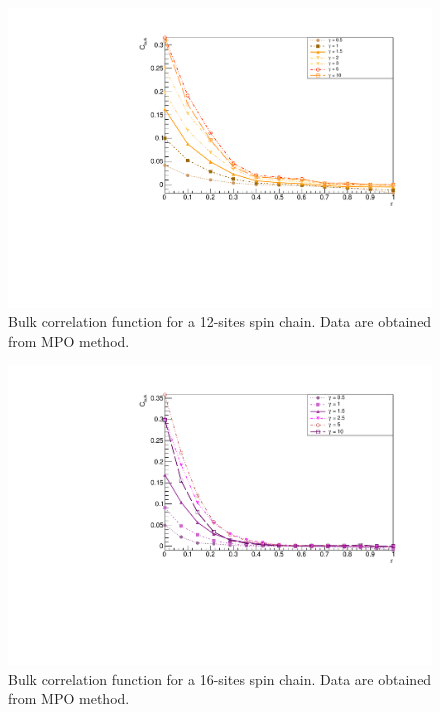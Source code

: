 \begin{figure}[H]
    \centering
    \includegraphics[scale=0.7]{Figures/12sites/12sites_CFBulkCONNVSgamma.pdf}
    \caption{Bulk correlation function for a 12-sites spin chain. Data are obtained from MPO method.}
    \label{fig:12sites_CFBulkCONNVSgamma}
\end{figure}

\begin{figure}[H]
    \centering
    \includegraphics[scale=0.7]{Figures/16sites/16sites_CFBulkCONNVSgamma.pdf}
    \caption{Bulk correlation function for a 16-sites spin chain. Data are obtained from MPO method.}
    \label{fig:16sites_CFBulkCONNVSgamma}
\end{figure}

